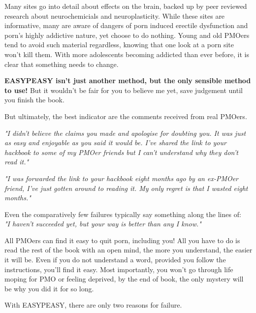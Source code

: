 \documentclass[easypeasy.tex]{subfiles}
\begin{document}
Many sites go into detail about effects on the brain, backed up by peer reviewed research about neurochemicials and neuroplasticity. While these sites are informative, many are aware of dangers of porn induced erectile dysfunction and porn's highly addictive nature, yet choose to do nothing. Young and old PMOers tend to avoid such material regardless, knowing that one look at a porn site won't kill them. With more adolescents becoming addicted than ever before, it is clear that something needs to change.

\textbf{EASYPEASY isn't just another method, but the only sensible method to use!} But it wouldn't be fair for you to believe me yet, save judgement until you finish the book.

But ultimately, the best indicator are the comments received from real PMOers.

\textit{"I didn't believe the claims you made and apologise for doubting you. It was just as easy and enjoyable as you said it would be. I've shared the link to your hackbook to some of my PMOer friends but I can't understand why they don't read it."}

\textit{"I was forwarded the link to your hackbook eight months ago by an ex-PMOer friend, I've just gotten around to reading it. My only regret is that I wasted eight months."}

Even the comparatively few failures typically say something along the lines of:\\ \textit{"I haven't succeeded yet, but your way is better than any I know."}

All PMOers can find it easy to quit porn, including you! All you have to do is read the rest of the book with an open mind, the more you understand, the easier it will be. Even if you do not understand a word, provided you follow the instructions, you'll find it easy. Most importantly, you won't go through life moping for PMO or feeling deprived, by the end of book, the only mystery will be why you did it for so long.

With EASYPEASY, there are only two reasons for failure.
\end{document}
